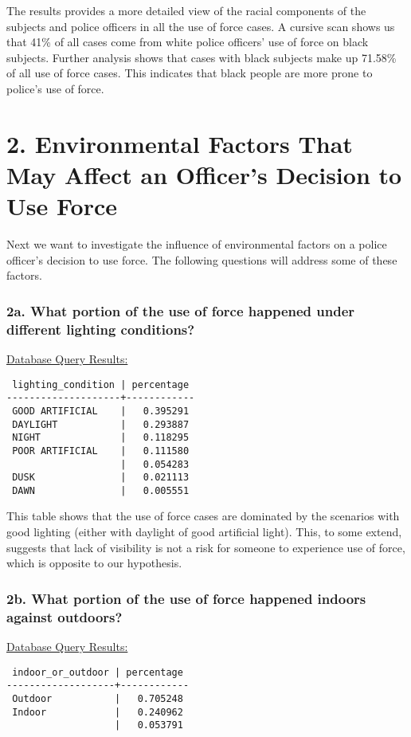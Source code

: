 \documentclass[10pt]{article}
\begin{document}
The results provides a more detailed view of the racial components of the subjects and police officers in all the use of force cases. A cursive scan shows us that 41\% of all cases come from white police officers' use of force on black subjects. Further analysis shows that cases with black subjects make up 71.58\% of all use of force cases. This indicates that black people are more prone to police's use of force.


\section*{2. Environmental Factors That May Affect an Officer’s Decision to Use Force}

Next we want to investigate the influence of environmental factors on a police officer's decision to use force. The following questions will address some of these factors.

\subsubsection*{2a. What portion of the use of force happened under different lighting conditions?}

\underline{Database Query Results:}

\begin{verbatim}
 lighting_condition | percentage
--------------------+------------
 GOOD ARTIFICIAL    |   0.395291
 DAYLIGHT           |   0.293887
 NIGHT              |   0.118295
 POOR ARTIFICIAL    |   0.111580
                    |   0.054283
 DUSK               |   0.021113
 DAWN               |   0.005551
\end{verbatim}

This table shows that the use of force cases are dominated by the scenarios with good lighting (either with daylight of good artificial light). This, to some extend, suggests that lack of visibility is not a risk for someone to experience use of force, which is opposite to our hypothesis.

\subsubsection*{2b. What portion of the use of force happened indoors against outdoors?}

\underline{Database Query Results:}

\begin{verbatim}
 indoor_or_outdoor | percentage
-------------------+------------
 Outdoor           |   0.705248
 Indoor            |   0.240962
                   |   0.053791
\end{verbatim}
\end{document}
